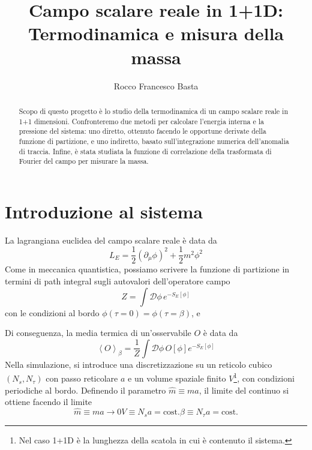 \documentclass[a4paper,11pt]{article}
\title{Campo scalare reale in 1+1D: Termodinamica e misura della massa}
\author{Rocco Francesco Basta}
\date{}
\newcommand{\avg}[1]{\left\langle {#1} \right\rangle}
\begin{document}
\maketitle

\begin{abstract}
    Scopo di questo progetto è lo studio della termodinamica di un campo scalare reale in 1+1 dimensioni. Confronteremo due metodi per calcolare l'energia interna e la pressione del sistema: uno diretto, ottenuto facendo le opportune derivate della funzione di partizione, e uno indiretto, basato sull'integrazione numerica dell'anomalia di traccia. Infine, è stata studiata la funzione di correlazione della trasformata di Fourier del campo per misurare la massa.
\end{abstract}

\section{Introduzione al sistema}
    La lagrangiana euclidea del campo scalare reale è data da
    \begin{equation}
        L_E = \frac{1}{2} (\partial_\mu \phi )^2 + \frac{1}{2}m^2 \phi^2 
    \end{equation}
    Come in meccanica quantistica, possiamo scrivere la funzione di partizione in termini di path integral sugli autovalori dell'operatore campo
    \begin{equation}
        Z = \int \mathcal{D}\phi \, e^{-S_E[\phi]}
        \label{eqn:z-path-integral}
    \end{equation}
    con le condizioni al bordo $\phi(\tau = 0) = \phi(\tau = \beta)$, e
    
    Di conseguenza, la media termica di un'osservabile $O$ è data da
    \begin{equation}
        \avg{O}_\beta = \frac{1}{Z} \int \mathcal{D} \phi \, O[\phi] e^{-S_E[\phi]}
    \end{equation}
    Nella simulazione, si introduce una discretizzazione su un reticolo cubico $(N_s, N_\tau)$ con passo reticolare $a$ e un volume spaziale finito $V$\footnote{Nel caso 1+1D è la lunghezza della scatola in cui è contenuto il sistema.}, con condizioni periodiche al bordo. Definendo il parametro $\hat{m} \equiv ma$, il limite del continuo si ottiene facendo il limite
    \begin{subequations}
        \begin{equation}
            \hat{m} \equiv ma \to 0
        \end{equation}
        \begin{equation}
            V \equiv N_s a = \text{cost.}
        \end{equation}
        \begin{equation}
            \beta \equiv N_\tau a = \text{cost.}
        \end{equation}
    \end{subequations}
    
\end{document}
